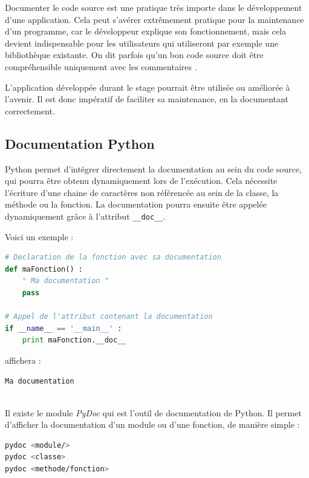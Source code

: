 Documenter le code source est une pratique très importe dans le développement d'une application.
Cela peut s'avérer extrêmement pratique pour la maintenance d'un programme, car le développeur explique son fonctionnement, mais cela devient indispensable pour les utilisateurs qui utiliseront par exemple une bibliothèque existante.
On dit parfois qu'\og un bon code source doit être compréhensible uniquement avec les commentaires \fg.

L'application développée durant le stage pourrait être utilisée ou améliorée à l'avenir.
Il est donc impératif de faciliter sa maintenance, en la documentant correctement.
\\





\subsection{Documentation Python}

Python permet d'intégrer directement la documentation au sein du code source, qui pourra être obtenu dynamiquement lors de l'exécution.
Cela nécessite l'écriture d'une chaine de caractères non référencée au sein de la classe, la méthode ou la fonction.
La documentation pourra ensuite être appelée dynamiquement grâce à l'attribut \lstinline{__doc__}.

Voici un exemple :
\begin{lstlisting}[language=Python]
# Declaration de la fonction avec sa documentation
def maFonction() :
    " Ma documentation "
    pass

# Appel de l'attribut contenant la documentation
if __name__ == '__main__' :
    print maFonction.__doc__
\end{lstlisting}
affichera :
\begin{lstlisting}[language=sh]
Ma documentation
\end{lstlisting}
~~\\


Il existe le module \textit{PyDoc} qui est l'outil de documentation de Python.
Il permet d'afficher la documentation d'un module ou d'une fonction, de manière simple :
\begin{lstlisting}[language=sh]
pydoc <module/>
pydoc <classe>
pydoc <methode/fonction>
\end{lstlisting}
~~\\




